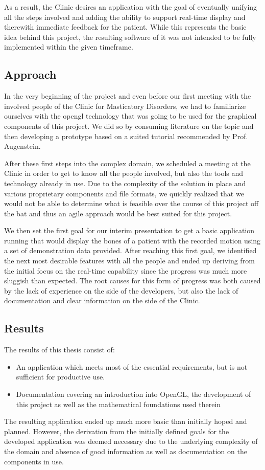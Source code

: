 As a result, the Clinic desires an application with the goal of eventually unifying all the steps involved and adding the ability to support real-time display and therewith immediate feedback for the patient. While this represents the basic idea behind this project, the resulting software of it was not intended to be fully implemented within the given timeframe.


\subsection{Approach}

In the very beginning of the project and even before our first meeting with the involved people of the Clinic for Masticatory Disorders, we had to familiarize ourselves with the \gls{opengl} technology that was going to be used for the graphical components of this project. We did so by consuming literature on the topic and then developing a prototype based on a suited tutorial recommended by Prof. Augenstein.

After these first steps into the complex domain, we scheduled a meeting at the Clinic in order to get to know all the people involved, but also the tools and technology already in use. Due to the complexity of the solution in place and various proprietary components and file formats, we quickly realized that we would not be able to determine what is feasible over the course of this project off the bat and thus an agile approach would be best suited for this project.

We then set the first goal for our interim presentation to get a basic application running that would display the bones of a patient with the recorded motion using a set of demonstration data provided. After reaching this first goal, we identified the next most desirable features with all the people and ended up deriving from the initial focus on the real-time capability since the progress was much more sluggish than expected. The root causes for this form of progress was both caused by the lack of experience on the side of the developers, but also the lack of documentation and clear information on the side of the Clinic.

\subsection{Results}
The results of this thesis consist of:
\begin{itemize}
	\item  An application which meets most of the essential requirements, but is not sufficient for productive use. 
	\item  Documentation covering an introduction into OpenGL, the development of this project as well as the mathematical foundations used therein
\end{itemize}
The resulting application ended up much more basic than initially hoped and planned. However, the derivation from the initially defined goals for the developed application was deemed necessary due to the underlying complexity of the domain and absence of good information as well as documentation on the components in use.

